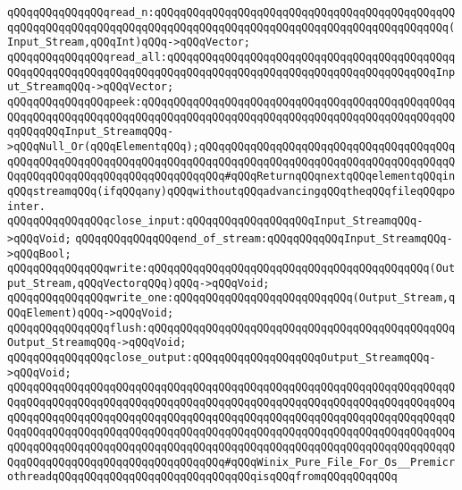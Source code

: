 \newline
\verb|qQQqqQQqqQQqqQQqread_n:qQQqqQQqqQQqqQQqqQQqqQQqqQQqqQQqqQQqqQQqqQQqqQQqqQQqqQQqqQQqqQQqqQQqqQQqqQQqqQQqqQQqqQQqqQQqqQQqqQQqqQQqqQQqqQQqqQQq(Input_Stream,qQQqInt)qQQq->qQQqVector;|\newline
\verb|qQQqqQQqqQQqqQQqread_all:qQQqqQQqqQQqqQQqqQQqqQQqqQQqqQQqqQQqqQQqqQQqqQQqqQQqqQQqqQQqqQQqqQQqqQQqqQQqqQQqqQQqqQQqqQQqqQQqqQQqqQQqqQQqqQQqInput_StreamqQQq->qQQqVector;|\newline
\newline
\verb|qQQqqQQqqQQqqQQqpeek:qQQqqQQqqQQqqQQqqQQqqQQqqQQqqQQqqQQqqQQqqQQqqQQqqQQqqQQqqQQqqQQqqQQqqQQqqQQqqQQqqQQqqQQqqQQqqQQqqQQqqQQqqQQqqQQqqQQqqQQqqQQqqQQqInput_StreamqQQq->qQQqNull_Or(qQQqElementqQQq);qQQqqQQqqQQqqQQqqQQqqQQqqQQqqQQqqQQqqQQqqQQqqQQqqQQqqQQqqQQqqQQqqQQqqQQqqQQqqQQqqQQqqQQqqQQqqQQqqQQqqQQqqQQqqQQqqQQqqQQqqQQqqQQqqQQqqQQqqQQqqQQq#qQQqReturnqQQqnextqQQqelementqQQqinqQQqstreamqQQq(ifqQQqany)qQQqwithoutqQQqadvancingqQQqtheqQQqfileqQQqpointer.|\newline
\newline
\verb|qQQqqQQqqQQqqQQqclose_input:qQQqqQQqqQQqqQQqqQQqInput_StreamqQQq->qQQqVoid;|\newline
\verb|qQQqqQQqqQQqqQQqend_of_stream:qQQqqQQqqQQqInput_StreamqQQq->qQQqBool;|\newline
\newline
\verb|qQQqqQQqqQQqqQQqwrite:qQQqqQQqqQQqqQQqqQQqqQQqqQQqqQQqqQQqqQQqqQQq(Output_Stream,qQQqVectorqQQq)qQQq->qQQqVoid;|\newline
\verb|qQQqqQQqqQQqqQQqwrite_one:qQQqqQQqqQQqqQQqqQQqqQQqqQQq(Output_Stream,qQQqElement)qQQq->qQQqVoid;|\newline
\verb|qQQqqQQqqQQqqQQqflush:qQQqqQQqqQQqqQQqqQQqqQQqqQQqqQQqqQQqqQQqqQQqqQQqOutput_StreamqQQq->qQQqVoid;|\newline
\verb|qQQqqQQqqQQqqQQqclose_output:qQQqqQQqqQQqqQQqqQQqOutput_StreamqQQq->qQQqVoid;|\newline
\verb|qQQqqQQqqQQqqQQqqQQqqQQqqQQqqQQqqQQqqQQqqQQqqQQqqQQqqQQqqQQqqQQqqQQqqQQqqQQqqQQqqQQqqQQqqQQqqQQqqQQqqQQqqQQqqQQqqQQqqQQqqQQqqQQqqQQqqQQqqQQqqQQqqQQqqQQqqQQqqQQqqQQqqQQqqQQqqQQqqQQqqQQqqQQqqQQqqQQqqQQqqQQqqQQqqQQqqQQqqQQqqQQqqQQqqQQqqQQqqQQqqQQqqQQqqQQqqQQqqQQqqQQqqQQqqQQqqQQqqQQqqQQqqQQqqQQqqQQqqQQqqQQqqQQqqQQqqQQqqQQqqQQqqQQqqQQqqQQqqQQqqQQqqQQqqQQqqQQqqQQqqQQqqQQqqQQqqQQqqQQqqQQq#qQQqWinix_Pure_File_For_Os__PremicrothreadqQQqqQQqqQQqqQQqqQQqqQQqqQQqqQQqisqQQqfromqQQqqQQqqQQq|\newline
